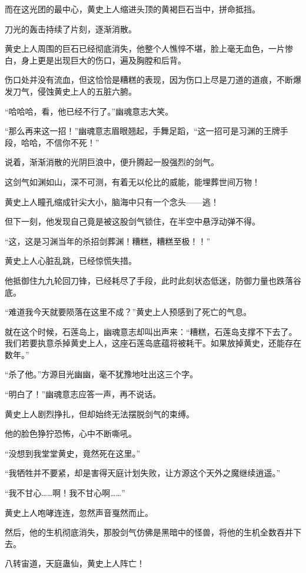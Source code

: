\begin{this_body}
而在这光团的最中心，黄史上人缩进头顶的黄褐巨石当中，拼命抵挡。

刀光的轰击持续了片刻，逐渐消散。

黄史上人周围的巨石已经彻底消失，他整个人憔悴不堪，脸上毫无血色，一片惨白，身上更是出现巨大的伤口，遍及胸膛和后背。

伤口处并没有流血，但这恰恰是糟糕的表现，因为伤口上尽是刀道的道痕，不断爆发刀气，侵蚀黄史上人的五脏六腑。

“哈哈哈，看，他已经不行了。”幽魂意志大笑。

“那么再来这一招！”幽魂意志眉眼翘起，手舞足蹈，“这一招可是习渊的王牌手段，哈哈，不信你不死！”

说着，渐渐消散的光阴巨浪中，便升腾起一股强烈的剑气。

这剑气如渊如山，深不可测，有着无以伦比的威能，能埋葬世间万物！

黄史上人瞳孔缩成针尖大小，脑海中只有一个念头——逃！

但下一刻，他发现自己竟是被这股剑气锁住，在半空中悬浮动弹不得。

“这，这是习渊当年的杀招剑葬渊！糟糕，糟糕至极！！”

黄史上人心脏乱跳，已经惊慌失措。

他抵御住九九轮回刀锋，已经耗尽了手段，此时此刻状态低迷，防御力量也跌落谷底。

“难道我今天就要陨落在这里不成？”黄史上人预感到了死亡的气息。

就在这个时候，石莲岛上，幽魂意志却叫出声来：“糟糕，石莲岛支撑不下去了。我们若要执意杀掉黄史上人，这座石莲岛底蕴将被耗干。如果放掉黄史，还能存在数年。”

“杀了他。”方源目光幽幽，毫不犹豫地吐出这三个字。

“明白了！”幽魂意志应答一声，再不说话。

黄史上人剧烈挣扎，但却始终无法摆脱剑气的束缚。

他的脸色狰狞恐怖，心中不断嘶吼。

“没想到我堂堂黄史，竟然死在这里。”

“我牺牲并不要紧，却是害得天庭计划失败，让方源这个天外之魔继续逍遥。”

“我不甘心……啊！我不甘心啊……”

黄史上人咆哮连连，忽然声音戛然而止。

然后，他的生机彻底消失，那股剑气仿佛是黑暗中的怪兽，将他的生机全数吞并下去。

八转宙道，天庭蛊仙，黄史上人阵亡！

\end{this_body}

